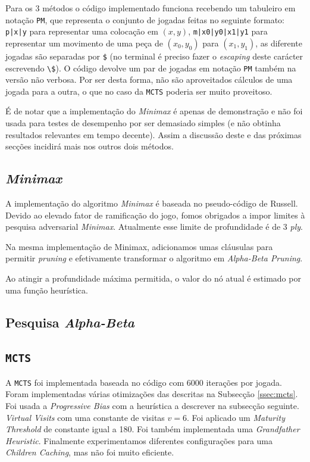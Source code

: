 \documentclass[12pt,a4paper,oneside]{article}
\begin{document}
Para os 3 métodos o código implementado funciona recebendo um
tabuleiro em notação \texttt{PM}, que representa o conjunto de jogadas
feitas no seguinte formato: \texttt{p|x|y} para representar uma
colocação em $(x, y)$, \texttt{m|x0|y0|x1|y1} para representar um
movimento de uma peça de $(x_0, y_0)$ para $(x_1, y_1)$, as diferente
jogadas são separadas por \texttt{\$} (no terminal é preciso fazer o
\textit{escaping} deste carácter escrevendo
\texttt{\textbackslash\$}). O código devolve um par de jogadas em
notação \texttt{PM} também na versão não verbosa. Por ser desta forma,
não são aproveitados cálculos de uma jogada para a outra, o que no
caso da \texttt{MCTS} poderia ser muito proveitoso.

É de notar que a implementação do \textit{Minimax} é apenas de
demonstração e não foi usada para testes de desempenho por ser
demasiado simples (e não obtinha resultados relevantes em tempo
decente). Assim a discussão deste e das próximas secções incidirá mais
nos outros dois métodos.

\subsection{\textit{Minimax}}

A implementação do algoritmo \textit{Minimax} é baseada no pseudo-código de
Russell\cite{Russell:AI:2003}. Devido ao elevado fator de ramificação
do jogo, fomos obrigados a impor limites à pesquisa adversarial
\textit{Minimax}. Atualmente esse limite de profundidade é de 3 \emph{ply}.

Na mesma implementação de Minimax, adicionamos umas cláusulas para
permitir \emph{pruning} e efetivamente transformar o algoritmo em
\emph{Alpha-Beta Pruning}.

Ao atingir a profundidade máxima permitida, o valor do nó atual é
estimado por uma função heurística.

\subsection{Pesquisa \textit{Alpha-Beta}}

\lipsum[1]

\lipsum[2]

\subsection{\texttt{MCTS}}

A \texttt{MCTS} foi implementada baseada no código \cite{MCTSHub} com
6000 iterações por jogada. Foram implementadas várias otimizações das
descritas na Subsecção \ref{ssec:mcts}. Foi usada a
\textit{Progressive Bias} com a heurística a descrever na subsecção
seguinte. \textit{Virtual Visits} com uma constante de visitas $v =
6$. Foi aplicado um \textit{Maturity Threshold} de constante igual a
180. Foi também implementada uma \textit{Grandfather
  Heuristic}. Finalmente experimentamos diferentes configurações para
uma \textit{Children Caching}, mas não foi muito eficiente.
\end{document}
